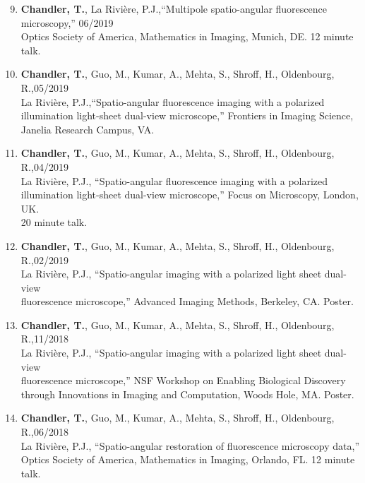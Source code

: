 \documentclass[12pt,letterpaper]{article}
\newenvironment{benumerate}[1]{
    \let\oldItem\item
    \def\item{\addtocounter{enumi}{-2}\oldItem}
    \begin{enumerate}[labelsep=0.0125\textwidth, align=left]
    \setcounter{enumi}{#1}
    \addtocounter{enumi}{1}
}{
    \end{enumerate}
  }
\begin{document}
\nocite{*}
\setlength{}
\printbibliography[heading=none, type=misc, sorting=ynt, resetnumbers=true]

\begin{benumerate}{8}
\item {\textbf{Chandler, T.}, La Rivi\`ere, P.J.,``Multipole spatio-angular fluorescence microscopy,'' \hfill 06/2019\\ Optics Society of America, Mathematics in Imaging, Munich, DE. 12 minute talk.}
  
\item {\textbf{Chandler, T.}, Guo, M., Kumar, A., Mehta, S., Shroff, H., Oldenbourg, R.,\hfill 05/2019\\ La Rivi\`ere, P.J.,``Spatio-angular fluorescence imaging with a polarized\\ illumination light-sheet dual-view microscope,'' Frontiers in Imaging Science,\\ Janelia Research Campus, VA.}
  
\item {\textbf{Chandler, T.}, Guo, M., Kumar, A., Mehta, S., Shroff, H., Oldenbourg, R.,\hfill 04/2019\\ La Rivi\`ere, P.J., ``Spatio-angular fluorescence imaging with a polarized\\ illumination light-sheet dual-view microscope,'' Focus on Microscopy, London, UK.\\ 20 minute talk.}
  
\item {\textbf{Chandler, T.}, Guo, M., Kumar, A., Mehta, S., Shroff, H., Oldenbourg, R.,\hfill 02/2019\\ La Rivi\`ere, P.J., ``Spatio-angular imaging with a polarized light sheet dual-view\\ fluorescence microscope,'' Advanced Imaging Methods, Berkeley, CA. Poster.}

\item {\textbf{Chandler, T.}, Guo, M., Kumar, A., Mehta, S., Shroff, H., Oldenbourg, R.,\hfill 11/2018\\ La Rivi\`ere, P.J., ``Spatio-angular imaging with a polarized light sheet dual-view \\ fluorescence microscope,'' NSF Workshop on Enabling Biological Discovery\\ through Innovations in Imaging and Computation, Woods Hole, MA. Poster.}
  
\item {\textbf{Chandler, T.}, Guo, M., Kumar, A., Mehta, S., Shroff, H., Oldenbourg, R.,\hfill 06/2018\\ La Rivi\`ere, P.J., ``Spatio-angular restoration of fluorescence microscopy data,'' \\
      Optics Society of America, Mathematics in Imaging, Orlando, FL. 12 minute talk.}
  

\end{benumerate}
\end{document}
